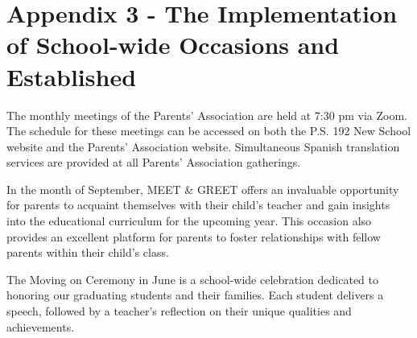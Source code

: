 \documentclass[11pt, letterpaper]{article}
\begin{document}
\section{Appendix 3 - The Implementation of School-wide Occasions and Established}\label{thirdappendix}
The monthly meetings of the Parents' Association are held at 7:30 pm via Zoom. The schedule for these meetings can be accessed on both the P.S. 192 New School website and the Parents' Association website. Simultaneous Spanish translation services are provided at all Parents' Association gatherings.

In the month of September, MEET \& GREET offers an invaluable opportunity for parents to acquaint themselves with their child's teacher and gain insights into the educational curriculum for the upcoming year. This occasion also provides an excellent platform for parents to foster relationships with fellow parents within their child's class.

The Moving on Ceremony in June is a school-wide celebration dedicated to honoring our graduating students and their families. Each student delivers a speech, followed by a teacher's reflection on their unique qualities and achievements.





\newpage
\thispagestyle{empty}
%
\end{document}
